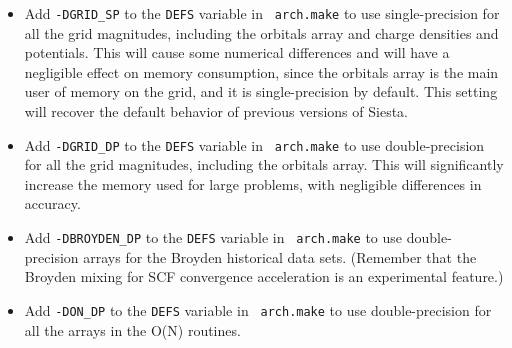 \documentclass[11pt]{article}
\begin{document}
\begin{itemize}

\item Add {\tt -DGRID\_SP} to the {\tt DEFS} variable in {\tt
  arch.make} to use single-precision for all the grid magnitudes,
  including the orbitals array and charge densities and potentials.
  This will cause some numerical differences and will have a
  negligible effect on memory consumption, since the orbitals array is
  the main user of memory on the grid, and it is single-precision by
  default. This setting will recover the default behavior of previous
  versions of {\sc Siesta}.

\item Add {\tt -DGRID\_DP} to the {\tt DEFS} variable in {\tt
  arch.make} to use double-precision for all the grid magnitudes,
  including the orbitals array. This will significantly increase
  the memory used for large problems, with negligible differences
  in accuracy.


\item Add {\tt -DBROYDEN\_DP} to the {\tt DEFS} variable in {\tt
  arch.make} to use double-precision arrays for the Broyden historical
  data sets. (Remember that the Broyden mixing for SCF convergence
  acceleration is an experimental feature.)

\item Add {\tt -DON\_DP} to the {\tt DEFS} variable in {\tt
  arch.make} to use double-precision for all the arrays in the
  O(N) routines. 

\end{itemize}

\printindex
\end{document}
